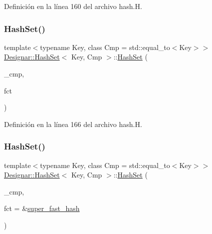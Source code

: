 Definición en la línea 160 del archivo hash.\+H.

\mbox{\label{class_designar_1_1_hash_set_aea364027e144f9a079ba56f1c0608c37}} 
\subsubsection{\texorpdfstring{Hash\+Set()}{HashSet()}\hspace{0.1cm}{\footnotesize\ttfamily [7/12]}}
{\footnotesize\ttfamily template$<$typename Key, class Cmp = std\+::equal\+\_\+to$<$\+Key$>$$>$ \\
\hyperlink{class_designar_1_1_hash_set}{Designar\+::\+Hash\+Set}$<$ Key, Cmp $>$\+::\hyperlink{class_designar_1_1_hash_set}{Hash\+Set} (\begin{DoxyParamCaption}\item[{Cmp \&\&}]{\+\_\+cmp,  }\item[{\hyperlink{class_designar_1_1_hash_set_a05d8d111665c25bc17290c01fa299398}{Hash\+Fct\+Type}}]{fct }\end{DoxyParamCaption})\hspace{0.3cm}{\ttfamily [inline]}}



Definición en la línea 166 del archivo hash.\+H.

\mbox{\label{class_designar_1_1_hash_set_a936fde31abdaab2deac50bfbe4d361a0}} 
\subsubsection{\texorpdfstring{Hash\+Set()}{HashSet()}\hspace{0.1cm}{\footnotesize\ttfamily [8/12]}}
{\footnotesize\ttfamily template$<$typename Key, class Cmp = std\+::equal\+\_\+to$<$\+Key$>$$>$ \\
\hyperlink{class_designar_1_1_hash_set}{Designar\+::\+Hash\+Set}$<$ Key, Cmp $>$\+::\hyperlink{class_designar_1_1_hash_set}{Hash\+Set} (\begin{DoxyParamCaption}\item[{Cmp \&}]{\+\_\+cmp,  }\item[{\hyperlink{class_designar_1_1_hash_set_a7a8b0a4970519ebc9ccc1ad247d0639f}{Hash\+Fct\+Ptr}}]{fct = {\ttfamily \&\hyperlink{namespace_designar_afd5712d16b3ae1c1c7d59f1004cd96fd}{super\+\_\+fast\+\_\+hash}} }\end{DoxyParamCaption})\hspace{0.3cm}{\ttfamily [inline]}}




